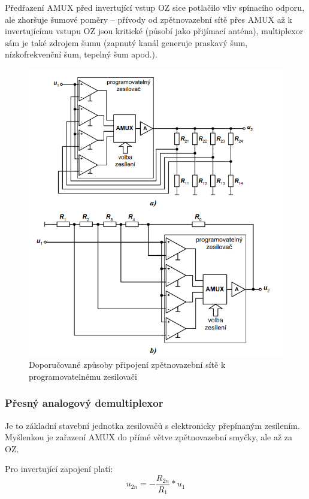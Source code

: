Předřazení AMUX před invertující vstup OZ sice potlačilo vliv spínacího odporu, ale zhoršuje šumové poměry – přívody od zpětnovazební sítě přes AMUX až k invertujícímu vstupu OZ jsou kritické (působí jako přijímací anténa), multiplexor sám je také zdrojem šumu (zapnutý kanál generuje praskavý šum, nízkofrekvenční šum, tepelný šum apod.).
\begin{figure}[h]
   \begin{center}
     \includegraphics[scale=0.6]{images/Amux6.png}
   \end{center}
   \caption{Doporučované způsoby připojení zpětnovazební sítě k programovatelnému zesilovači}
\end{figure}

\pagebreak
\subsubsection{Přesný analogový demultiplexor}
Je to základní stavební jednotka zesilovačů s elektronicky přepínaným zesílením. Myšlenkou je zařazení AMUX do přímé větve zpětnovazební smyčky, ale až za OZ.

Pro invertující zapojení platí:
\begin{equation}
u_{2n}=-\frac{R_{2n}}{R_{1}}*u_{1}
\end{equation}

